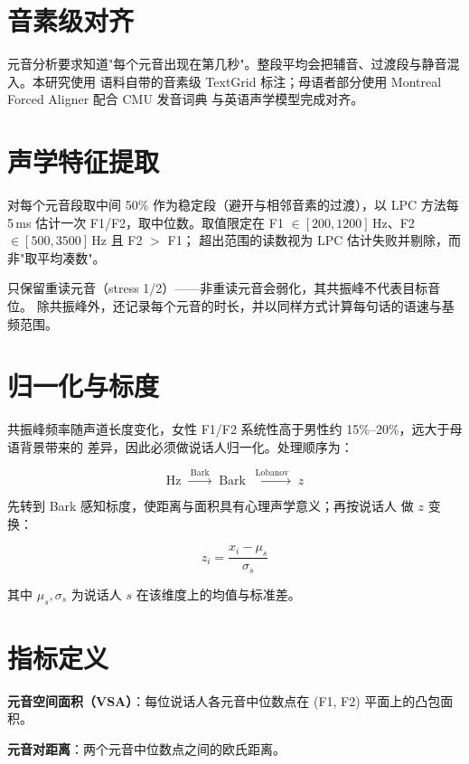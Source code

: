 \documentclass[12pt,a4paper,fontset=fandol]{ctexrep}
\begin{document}
\section{音素级对齐}

元音分析要求知道"每个元音出现在第几秒"。整段平均会把辅音、过渡段与静音混入。本研究使用
语料自带的音素级 TextGrid 标注；母语者部分使用 Montreal Forced Aligner 配合 CMU 发音词典
与英语声学模型完成对齐。

\section{声学特征提取}

对每个元音段取中间 50\% 作为稳定段（避开与相邻音素的过渡），以 LPC 方法每 5\,ms 估计一次
F1/F2，取中位数。取值限定在 F1 $\in [200,1200]$\,Hz、F2 $\in [500,3500]$\,Hz 且 F2 $>$ F1；
超出范围的读数视为 LPC 估计失败并剔除，而非"取平均凑数"。

只保留重读元音（stress 1/2）——非重读元音会弱化，其共振峰不代表目标音位。
除共振峰外，还记录每个元音的时长，并以同样方式计算每句话的语速与基频范围。

\section{归一化与标度}

共振峰频率随声道长度变化，女性 F1/F2 系统性高于男性约 15\%--20\%，远大于母语背景带来的
差异，因此必须做说话人归一化。处理顺序为：

\begin{equation}
\text{Hz} \;\xrightarrow{\;\text{Bark}\;}\; \text{Bark}
\;\xrightarrow{\;\text{Lobanov}\;}\; z
\end{equation}

先转到 Bark 感知标度\cite{traunmuller1990}，使距离与面积具有心理声学意义；再按说话人
做 $z$ 变换\cite{lobanov1971}：

\begin{equation}
z_i = \frac{x_i - \mu_s}{\sigma_s}
\end{equation}

其中 $\mu_s,\sigma_s$ 为说话人 $s$ 在该维度上的均值与标准差。

\section{指标定义}

\textbf{元音空间面积（VSA）}：每位说话人各元音中位数点在 (F1, F2) 平面上的凸包面积。

\textbf{元音对距离}：两个元音中位数点之间的欧氏距离。
\end{document}
